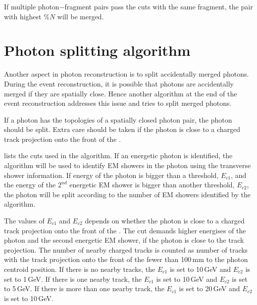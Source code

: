 If multiple photon$-$fragment pairs pass the cuts with the same fragment, the pair with highest $\%{N}$ will be merged.



\section{Photon splitting algorithm}
\label{sec:photonSplitting}


Another aspect in photon reconstruction is to split accidentally merged photons. During the event reconstruction, it is possible that photons are accidentally merged if they are spatially close. Hence another algorithm at the end of the event reconstruction addresses this issue and tries to split merged photons. 

If a photon has the  topologies of a spatially closed photon pair, the photon should be split. Extra care should be taken if the photon is close to a charged track projection onto the front of the \ECAL.


 lists the cuts used in the algorithm.  If an energetic photon is identified, the \peakFinding algorithm will  be used to identify EM showers in the photon using the transverse shower information. If energy of the photon is bigger than a threshold, $E_{c1}$, and the energy of the $2^{nd}$ energetic EM shower is bigger than another threshold, $E_{c2}$, the photon will be split according to the number of EM showers identified by the \peakFinding algorithm.

The values of $E_{c1}$ and $E_{c2}$ depends on whether the photon is close to a charged track projection onto the front of the \ECAL. The cut demands higher energises of the photon and the second energetic EM shower, if the photon is close to the track projection. The number of nearby charged tracks is counted as number of tracks with the track projection onto the front of the \ECAL fewer than 100\,mm to the photon centroid position. If there is no nearby tracks, the $E_{c1}$ is set to 10\,GeV and $E_{c2}$ is set to 1\,GeV. If there is one nearby track, the $E_{c1}$ is set to 10\,GeV and $E_{c2}$ is set to 5\,GeV. If there is more than one nearby track, the $E_{c1}$ is set to 20\,GeV and $E_{c2}$ is set to 10\,GeV.

